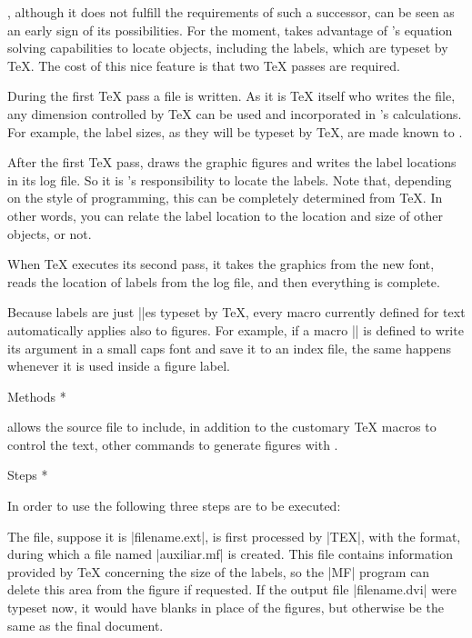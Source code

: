 \MTeX, although it does not fulfill the requirements of such a
successor, can be seen as an early sign of its possibilities.  For the
moment, {\MTeX} takes advantage of {\MF}'s equation solving capabilities
to locate objects, including the labels, which are typeset by {\TeX}.  The
cost of this nice feature is that two {\TeX} passes are required.

During the first {\TeX} pass a {\MF} file is written.  As it is {\TeX}
itself who writes the {\MF} file, any dimension controlled by {\TeX} can
be used and incorporated in {\MF}'s calculations.  For example, the label
sizes, as they will be typeset by {\TeX}, are made known to {\MF}.

After the first {\TeX} pass, {\MF} draws the graphic figures and
writes the label locations in its log file.  So it is {\MF}'s
responsibility to locate the labels.  Note that, depending on the style
of {\MF} programming, this can be completely determined from {\TeX}. In
other words, you can relate the label location to the location and size
of other {\MF} objects, or not.

When {\TeX} executes its second pass, it takes the graphics
from the new font, reads the location of labels from the
{\MF} log file, and then everything is complete.

Because labels are just |\hbox|es typeset by \TeX, every macro currently
defined for text automatically applies also to figures. For example, if
a macro |\person| is defined to write its argument in a small caps font
and save it to an index file, the same happens whenever it is used
inside a figure label.


\head * Methods *

{\MTeX} allows the source file to include, in addition to the customary
{\TeX} macros to control the text, other commands to generate
figures with {\MF}.

\subhead * Steps *

In order to use {\MTeX} the following three steps are to be executed:

\list[\numbered]

\item The {\MTeX} file, suppose it is |filename.ext|, is first
processed by |TEX|, with the {\plain} format, during which a {\MF} file
named |auxiliar.mf| is created.  This {\MF} file contains information
provided by {\TeX} concerning the size of the labels, so the |MF|
program can delete this area from the figure if requested. If the output
file |filename.dvi| were typeset now, it would have blanks in place of
the figures, but otherwise be the same as the final document.

